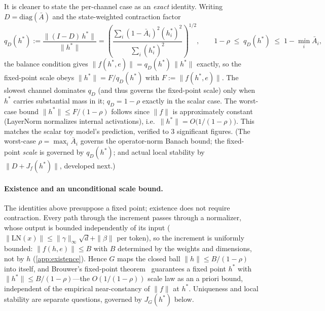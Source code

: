 \documentclass[11pt]{article}
\begin{document}
It is cleaner to state the per-channel case as an \emph{exact} identity. Writing $D = \text{diag}(\bar{A})$ and the state-weighted contraction factor
\begin{equation}
q_D(h^*) := \frac{\|(I - D)\,h^*\|}{\|h^*\|}
= \left(\frac{\sum_i (1 - \bar{A}_i)^2 (h^*_i)^2}{\sum_i (h^*_i)^2}\right)^{1/2},
\qquad 1 - \rho \;\le\; q_D(h^*) \;\le\; 1 - \min_i \bar{A}_i,
\label{eq:qd}
\end{equation}
the balance condition gives $\|f(h^*, e)\| = q_D(h^*)\,\|h^*\|$ exactly, so the fixed-point scale obeys $\|h^*\| = F/q_D(h^*)$ with $F := \|f(h^*, e)\|$. The slowest channel dominates $q_D$ (and thus governs the fixed-point scale) only when $h^*$ carries substantial mass in it; $q_D = 1 - \rho$ exactly in the scalar case. The worst-case bound $\|h^*\| \le F/(1-\rho)$ follows since $\|f\|$ is approximately constant (LayerNorm normalizes internal activations), i.e.\ $\|h^*\| = O\!\big(1/(1-\rho)\big)$. This matches the scalar toy model's prediction, verified to 3 significant figures. (The worst-case $\rho = \max_i \bar{A}_i$ governs the operator-norm Banach bound; the fixed-point \emph{scale} is governed by $q_D(h^*)$; and actual local stability by $\|D + J_f(h^*)\|$, developed next.)

\paragraph{Existence and an unconditional scale bound.} The identities above presuppose a fixed point; existence does not require contraction. Every path through the increment passes through a normalizer, whose output is bounded independently of its input ($\|\text{LN}(x)\| \le \|\gamma\|_\infty \sqrt{d} + \|\beta\|$ per token), so the increment is uniformly bounded: $\|f(h,e)\| \le B$ with $B$ determined by the weights and dimensions, not by $h$ (\cref{app:existence}). Hence $G$ maps the closed ball $\|h\| \le B/(1-\rho)$ into itself, and Brouwer's fixed-point theorem~\citep{granas2003} guarantees a fixed point $h^*$ with $\|h^*\| \le B/(1-\rho)$---the $O(1/(1-\rho))$ scale law as an a priori bound, independent of the empirical near-constancy of $\|f\|$ at $h^*$. Uniqueness and local stability are separate questions, governed by $J_G(h^*)$ below.
\end{document}

